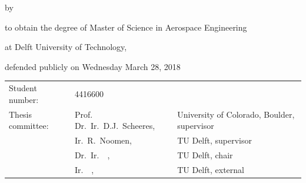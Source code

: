 \begin{titlepage}


\begin{center}


{\makeatletter
\titlestyle
\color{tudelft-cyan}
\fontsize{34}{30}
\selectfont{Perturbed orbital motion of regolith around an asteroid \par}
\makeatother}

\bigskip
\bigskip
{\makeatletter
\ifx\@subtitle\undefined\else
    \bigskip
   {\tudsffamily\fontsize{16}{32}\selectfont\@subtitle}
\fi
\makeatother}

\bigskip
\bigskip

by

\bigskip
\bigskip

{\makeatletter
\titlestyle\fontsize{26}{26}\selectfont\@author
\makeatother}

\bigskip
\bigskip

to obtain the degree of Master of Science in Aerospace Engineering

at Delft University of Technology,

defended publicly on Wednesday March 28, 2018

\vfill

\begin{tabular}{lll}
    Student number: & 4416600 \\
    Thesis committee: & Prof. Dr.\ Ir.\ D.J.\ Scheeres, & University of Colorado, Boulder, supervisor \\
        & Ir.\ R.\ Noomen, & TU Delft, supervisor \\
        & Dr.\ Ir.\ \ , & TU Delft, chair \\
        & Ir.\ \ , & TU Delft, external
\end{tabular}


\end{center}
\end{titlepage}
